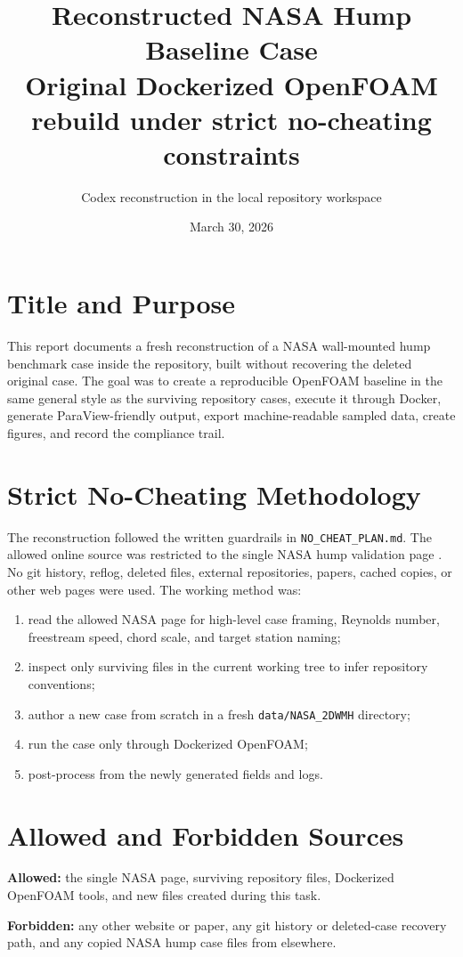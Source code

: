 \documentclass[11pt]{article}
\title{Reconstructed NASA Hump Baseline Case\\\large Original Dockerized OpenFOAM rebuild under strict no-cheating constraints}
\author{Codex reconstruction in the local repository workspace}
\date{March 30, 2026}
\begin{document}
\maketitle

\section{Title and Purpose}
This report documents a fresh reconstruction of a NASA wall-mounted hump benchmark case inside the repository, built without recovering the deleted original case. The goal was to create a reproducible OpenFOAM baseline in the same general style as the surviving repository cases, execute it through Docker, generate ParaView-friendly output, export machine-readable sampled data, create figures, and record the compliance trail.

\section{Strict No-Cheating Methodology}
The reconstruction followed the written guardrails in \texttt{NO\_CHEAT\_PLAN.md}. The allowed online source was restricted to the single NASA hump validation page \cite{nasahump}. No git history, reflog, deleted files, external repositories, papers, cached copies, or other web pages were used. The working method was:
\begin{enumerate}
\item read the allowed NASA page for high-level case framing, Reynolds number, freestream speed, chord scale, and target station naming;
\item inspect only surviving files in the current working tree to infer repository conventions;
\item author a new case from scratch in a fresh \texttt{data/NASA\_2DWMH} directory;
\item run the case only through Dockerized OpenFOAM;
\item post-process from the newly generated fields and logs.
\end{enumerate}

\section{Allowed and Forbidden Sources}
\textbf{Allowed:} the single NASA page, surviving repository files, Dockerized OpenFOAM tools, and new files created during this task.

\textbf{Forbidden:} any other website or paper, any git history or deleted-case recovery path, and any copied NASA hump case files from elsewhere.
\end{document}
